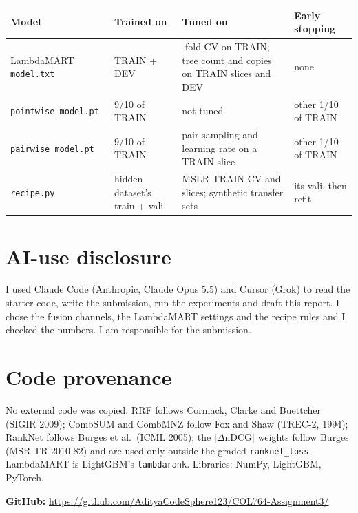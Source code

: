 \documentclass[10pt,a4paper]{article}
\begin{document}
\begin{center}
\normalsize\renewcommand{\arraystretch}{1.45}
\begin{tabularx}{\textwidth}{@{}ll>{\raggedright\arraybackslash}Xl@{}}
\toprule
Model & Trained on & Tuned on & Early stopping\\
\midrule
LambdaMART \texttt{model.txt} & TRAIN + DEV & 5-fold CV on TRAIN; tree count and copies on TRAIN slices and DEV & none\\
\texttt{pointwise\_model.pt} & 9/10 of TRAIN & not tuned & other 1/10 of TRAIN\\
\texttt{pairwise\_model.pt} & 9/10 of TRAIN & pair sampling and learning rate on a TRAIN slice & other 1/10 of TRAIN\\
\texttt{recipe.py} & hidden dataset's train + vali & MSLR TRAIN CV and slices; synthetic transfer sets & its vali, then refit\\
\bottomrule
\end{tabularx}
\end{center}

\section{AI-use disclosure}
I used Claude Code (Anthropic, Claude Opus 5.5) and Cursor (Grok) to read the starter code, write the submission, run the experiments and draft this report. I chose the fusion channels, the LambdaMART settings and the recipe rules and I checked the numbers. I am responsible for the submission.

\section{Code provenance}
No external code was copied. RRF follows Cormack, Clarke and Buettcher (SIGIR 2009); CombSUM and CombMNZ follow Fox and Shaw (TREC-2, 1994); RankNet follows Burges et al.\ (ICML 2005); the $|\Delta\mathrm{nDCG}|$ weights follow Burges (MSR-TR-2010-82) and are used only outside the graded \texttt{ranknet\_loss}. LambdaMART is LightGBM's \texttt{lambdarank}. Libraries: NumPy, LightGBM, PyTorch.

\textbf{GitHub:} \url{https://github.com/AdityaCodeSphere123/COL764-Assignment3/}
\end{document}
